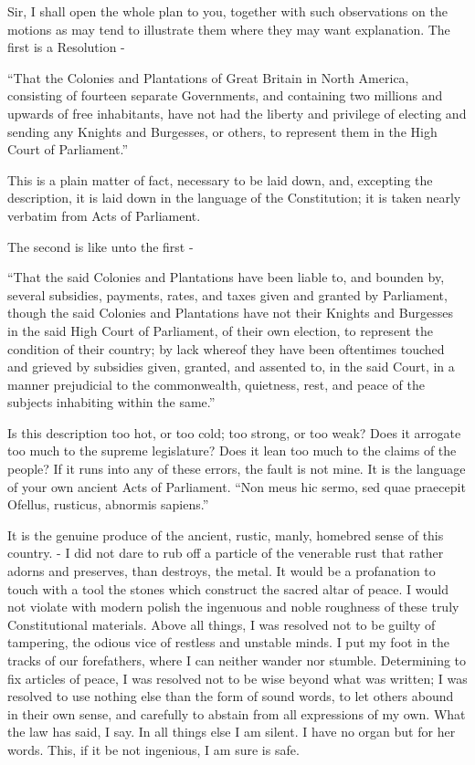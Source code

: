 Sir, I shall open the whole plan to you, together with such observations on the motions as may tend to illustrate them where they may want explanation. The first is a Resolution -\par

“That the Colonies and Plantations of Great Britain in North America, consisting of fourteen separate Governments, and containing two millions and upwards of free inhabitants, have not had the liberty and privilege of electing and sending any Knights and Burgesses, or others, to represent them in the High Court of Parliament.”\par

This is a plain matter of fact, necessary to be laid down, and, excepting the description, it is laid down in the language of the Constitution; it is taken nearly verbatim from Acts of Parliament.\par

The second is like unto the first -\par

“That the said Colonies and Plantations have been liable to, and bounden by, several subsidies, payments, rates, and taxes given and granted by Parliament, though the said Colonies and Plantations have not their Knights and Burgesses in the said High Court of Parliament, of their own election, to represent the condition of their country; by lack whereof they have been oftentimes touched and grieved by subsidies given, granted, and assented to, in the said Court, in a manner prejudicial to the commonwealth, quietness, rest, and peace of the subjects inhabiting within the same.”\par

Is this description too hot, or too cold; too strong, or too weak? Does it arrogate too much to the supreme legislature? Does it lean too much to the claims of the people? If it runs into any of these errors, the fault is not mine. It is the language of your own ancient Acts of Parliament. “Non meus hic sermo, sed quae praecepit Ofellus, rusticus, abnormis sapiens.”\par

It is the genuine produce of the ancient, rustic, manly, homebred sense of this country. - I did not dare to rub off a particle of the venerable rust that rather adorns and preserves, than destroys, the metal. It would be a profanation to touch with a tool the stones which construct the sacred altar of peace. I would not violate with modern polish the ingenuous and noble roughness of these truly Constitutional materials. Above all things, I was resolved not to be guilty of tampering, the odious vice of restless and unstable minds. I put my foot in the tracks of our forefathers, where I can neither wander nor stumble. Determining to fix articles of peace, I was resolved not to be wise beyond what was written; I was resolved to use nothing else than the form of sound words, to let others abound in their own sense, and carefully to abstain from all expressions of my own. What the law has said, I say. In all things else I am silent. I have no organ but for her words. This, if it be not ingenious, I am sure is safe.\par

